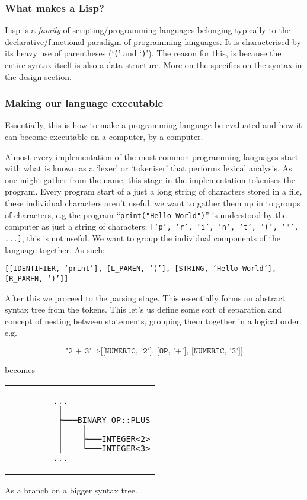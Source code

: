 \documentclass{article}
\newcommand{\code}[1]{\texttt{#1}}
\begin{document}
    \subsubsection{What makes a Lisp?}
    Lisp is a \emph{family} of scripting/programming languages belonging typically
    to the declarative/functional paradigm of programming languages. It is
    characterised by its heavy use of parentheses (`\code(' and `\code)').
    The reason for this, is because the entire
    syntax itself is also a data structure\autocite{milestones}.
    More on the specifics on the syntax in the design section.

    \subsubsection{Making our language executable}
    Essentially, this is how to make a programming language be evaluated and
    how it can become executable on a computer, by a computer.

    Almost every implementation of the most common programming languages start
    with what is known as a `lexer' or `tokeniser' that performs lexical analysis.
    As one might gather from the name, this stage in the
    implementation tokenises the program.
    Every program start of a just a long string of characters stored in a file, these
    individual characters aren't useful, we want to gather them up in to groups
    of characters, e.g the program ``\code{print("Hello World")}'' is understood by
    the computer as just a string of characters:
    \code{[`p', `r', `i', `n', `t', `(', `"', ...]}, this is not useful.
    We want to group the individual components of the language together.
    As such:

    \noindent\code{[[IDENTIFIER, `print'], [L\_PAREN, `('], [STRING, `Hello
    World'], [R\_PAREN, `)']]}

    After this we proceed to the parsing stage. This essentially forms an
    abstract syntax tree from the tokens. This let's us define some sort of
    separation and concept of nesting between statements,
    grouping them together in a logical order.\autocite{dragon}
    e.g.

    \[ \code{"2 + 3"} \Rightarrow \code{[[NUMERIC, '2'], [OP, '+'], [NUMERIC,
'3']]}  \]
    \centerline{becomes}
    \begin{center}
      \begin{tabular}{l}
        \begin{BVerbatim}
         ...
          │
          ├───BINARY_OP::PLUS
          │    │
          │    ├───INTEGER<2>
          │    └───INTEGER<3>
         ...
       \end{BVerbatim}
      \end{tabular}
      As a branch on a bigger syntax tree.
    \end{center}
\end{document}
